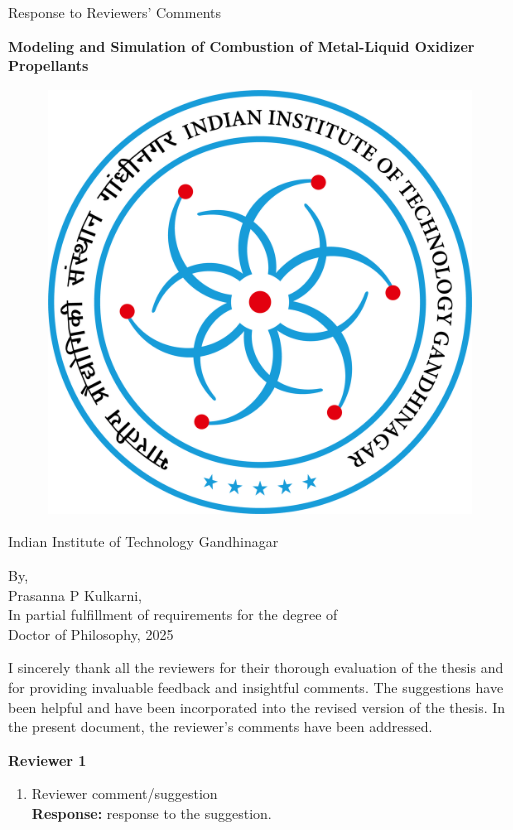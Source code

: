 \documentclass[12pt]{report}
\newcommand{\thTitle}{Modeling and Simulation of Combustion of Metal-Liquid Oxidizer Propellants}
\begin{document}
\begin{center}
    \LARGE
    \singlespacing
    Response to Reviewers' Comments
\end{center}

\begin{center}
    \LARGE
    \singlespacing
    \textbf{\thTitle}
\end{center}

\vspace{20mm}
\begin{figure}[h]
    \centering
    \includegraphics[width=0.4\linewidth]{IITGN_logo.png}
\end{figure}

\begin{center}
    \large
    Indian Institute of Technology Gandhinagar
\end{center}

\vspace{15mm}
\begin{flushleft}
    \large
    By, \\
    {
    Prasanna P Kulkarni, \\
    In partial fulfillment of requirements for the degree of \\
    \vspace{-1mm}
    Doctor of Philosophy, 2025
    }
\end{flushleft}

\newpage
\large
I sincerely thank all the reviewers for their thorough evaluation of the thesis and for providing invaluable feedback and insightful comments. The suggestions have been helpful and have been incorporated into the revised version of the thesis. In the present document, the reviewer's comments have been addressed.

\LARGE
\textbf{Reviewer 1}

\large 

\begin{enumerate}
    \item Reviewer comment/suggestion\\
    \textbf{Response:} response to the suggestion. 


\end{enumerate}
\end{document}
